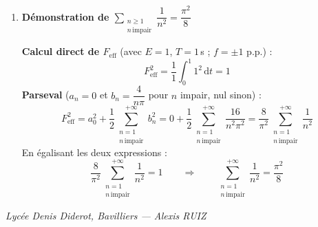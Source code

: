 \documentclass[a4paper,11pt]{article}
\begin{document}
\begin{enumerate}[label=\textbf{\arabic*.}]
\item \textbf{Démonstration de $\displaystyle\sum_{\substack{n\geq 1\\n\,\text{impair}}}\dfrac{1}{n^2} = \dfrac{\pi^2}{8}$}
\begin{tcolorbox}[corrigebox]
\textbf{Calcul direct de $F_{\mathrm{eff}}$} (avec $E=1$, $T=1$\,s ; $f = \pm 1$ p.p.) :
\[
F_{\mathrm{eff}}^2 = \frac{1}{1}\int_0^1 1^2\,\mathrm{d}t = 1
\]
\textbf{Parseval} ($a_n=0$ et $b_n = \dfrac{4}{n\pi}$ pour $n$ impair, nul sinon) :
\[
F_{\mathrm{eff}}^2 = a_0^2 + \frac{1}{2}\sum_{\substack{n=1\\n\,\text{impair}}}^{+\infty}b_n^2
= 0 + \frac{1}{2}\sum_{\substack{n=1\\n\,\text{impair}}}^{+\infty}\frac{16}{n^2\pi^2}
= \frac{8}{\pi^2}\sum_{\substack{n=1\\n\,\text{impair}}}^{+\infty}\frac{1}{n^2}
\]
En égalisant les deux expressions :
\[
\frac{8}{\pi^2}\sum_{\substack{n=1\\n\,\text{impair}}}^{+\infty}\frac{1}{n^2} = 1
\qquad\Longrightarrow\qquad
\boxed{\sum_{\substack{n=1\\n\,\text{impair}}}^{+\infty}\frac{1}{n^2} = \frac{\pi^2}{8}}
\]
\end{tcolorbox}

\end{enumerate}

\vfill
\begin{center}
\small\color{gray}\textit{Lycée Denis Diderot, Bavilliers — Alexis RUIZ}
\end{center}
\end{document}
